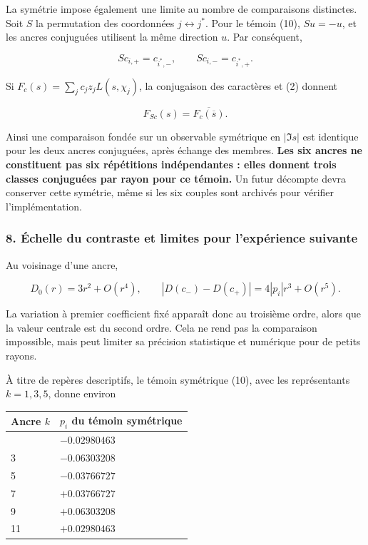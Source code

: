 \documentclass[
  10pt,
  a4paper,
]{article}
\begin{document}
La symétrie impose également une limite au nombre de comparaisons
distinctes. Soit \(S\) la permutation des coordonnées
\(j\leftrightarrow j^*\). Pour le témoin (10), \(Su=-u\), et les ancres
conjuguées utilisent la même direction \(u\). Par conséquent,

\[
S c_{i,+}=c_{i^*,-},\qquad S c_{i,-}=c_{i^*,+}.
\]

Si \(F_c(s)=\sum_j c_jz_jL(s,\chi_j)\), la conjugaison des caractères et
(2) donnent

\[
F_{Sc}(s)=\overline{F_c(\overline s)}.
\]

Ainsi une comparaison fondée sur un observable symétrique en \(|\Im s|\)
est identique pour les deux ancres conjuguées, après échange des
membres. \textbf{Les six ancres ne constituent pas six répétitions
indépendantes : elles donnent trois classes conjuguées par rayon pour ce
témoin.} Un futur décompte devra conserver cette symétrie, même si les
six couples sont archivés pour vérifier l'implémentation.

\hypertarget{uxe9chelle-du-contraste-et-limites-pour-lexpuxe9rience-suivante}{%
\subsubsection{8. Échelle du contraste et limites pour l'expérience
suivante}\label{uxe9chelle-du-contraste-et-limites-pour-lexpuxe9rience-suivante}}

Au voisinage d'une ancre,

\[
D_0(r)=3r^2+O(r^4),\qquad
|D(c_-)-D(c_+)|=4|p_i|r^3+O(r^5).
\]

La variation à premier coefficient fixé apparaît donc au troisième
ordre, alors que la valeur centrale est du second ordre. Cela ne rend
pas la comparaison impossible, mais peut limiter sa précision
statistique et numérique pour de petits rayons.

À titre de repères descriptifs, le témoin symétrique (10), avec les
représentants \(k=1,3,5\), donne environ

\begin{longtable}[]{@{}ll@{}}
\toprule\noalign{}
Ancre \(k\) & \(p_i\) du témoin symétrique \\
\midrule\noalign{}
\endhead
\bottomrule\noalign{}
\endlastfoot
1 & \(-0.02980463\) \\
3 & \(-0.06303208\) \\
5 & \(-0.03766727\) \\
7 & \(+0.03766727\) \\
9 & \(+0.06303208\) \\
11 & \(+0.02980463\) \\
\end{longtable}
\end{document}
